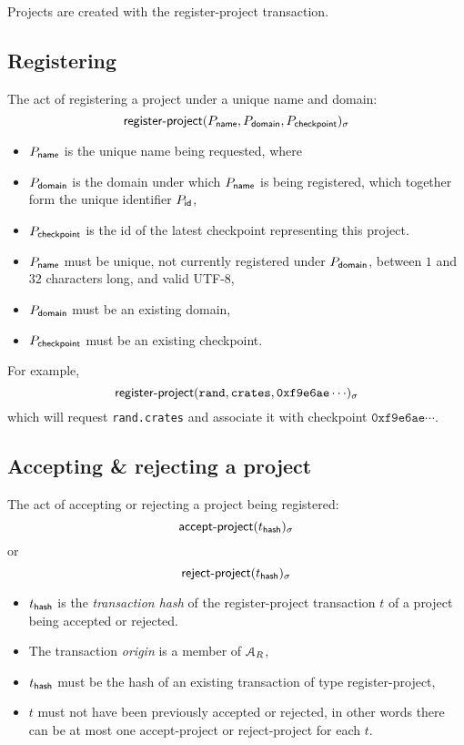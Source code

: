 Projects are created with the \textsf{register-project} transaction.

\subsection{Registering}
The act of registering a project under a unique name and domain:
\[
    \operatorname{\mathsf{register-project}}\lparen P_{\mathsf{name}}, P_{\mathsf{domain}}, P_{\mathsf{checkpoint}}\rparen_\sigma
\]

\begin{itemize}
    \item $P_{\mathsf{name}}$ is the unique name being requested, where
    \item $P_{\mathsf{domain}}$ is the domain under which $P_{\mathsf{name}}$ is
        being registered, which together form the unique identifier
        $P_{\mathsf{id}}$,
    \item $P_{\mathsf{checkpoint}}$ is the id of the latest checkpoint
        representing this project.
\end{itemize}
\validation
\begin{itemize}
    \item $P_{\mathsf{name}}$ must be unique, \ie not currently registered under
        $P_{\mathsf{domain}}$, between $1$ and $32$ characters long, and valid
        \textsf{UTF-8},
    \item $P_{\mathsf{domain}}$ must be an existing domain,
    \item $P_{\mathsf{checkpoint}}$ must be an existing checkpoint.
\end{itemize}
For example,
\[
    \operatorname{\mathsf{register-project}}\lparen\mathtt{rand}, \mathtt{crates}, \mathtt{0xf9e6ae}\cdots\rparen_\sigma
\]
which will request \texttt{rand.crates} and associate it with
checkpoint $\mathtt{0xf9e6ae}\cdots$.

\subsection{Accepting \& rejecting a project}
The act of accepting or rejecting a project being registered:
\[
    \operatorname{\mathsf{accept-project}}\lparen t_{\mathsf{hash}}\rparen_\sigma
\]
or
\[
    \operatorname{\mathsf{reject-project}}\lparen t_{\mathsf{hash}}\rparen_\sigma
\]

\begin{itemize}
    \item $t_{\mathsf{hash}}$ is the \emph{transaction hash} of the
        \textsf{register-project} transaction $t$ of a project
        being accepted or rejected.
\end{itemize}
\validation
\begin{itemize}
    \item The transaction \emph{origin} is a member of $\mathcal{A}_R$,
    \item $t_{\mathsf{hash}}$ must be the hash of an existing transaction of
        type \textsf{register-project},
    \item $t$ must not have been previously accepted or rejected, in other
        words there can be at most one \textsf{accept-project} or
        \textsf{reject-project} for each $t$.
\end{itemize}

